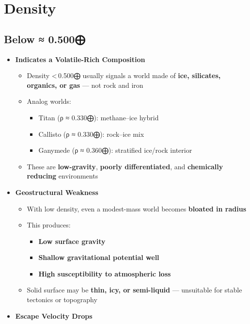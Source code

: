 \documentclass[
  letterpaper,
]{book}
\providecommand{\tightlist}{%
  \setlength{\itemsep}{0pt}\setlength{\parskip}{0pt}}
\begin{document}
\chapter{Density}\label{density}

\section{Below ≈ 0.500⨁}\label{below-0.500-1}

\begin{itemize}
\tightlist
\item
  \textbf{Indicates a Volatile-Rich Composition}

  \begin{itemize}
  \tightlist
  \item
    Density \textless\,0.500⨁ usually signals a world made of
    \textbf{ice, silicates, organics, or gas} --- not rock and iron\\
  \item
    Analog worlds:

    \begin{itemize}
    \tightlist
    \item
      Titan (ρ ≈ 0.330⨁): methane--ice hybrid\\
    \item
      Callisto (ρ ≈ 0.330⨁): rock--ice mix\\
    \item
      Ganymede (ρ ≈ 0.360⨁): stratified ice/rock interior\\
    \end{itemize}
  \item
    These are \textbf{low-gravity}, \textbf{poorly differentiated}, and
    \textbf{chemically reducing} environments
  \end{itemize}
\item
  \textbf{Geostructural Weakness}

  \begin{itemize}
  \tightlist
  \item
    With low density, even a modest-mass world becomes \textbf{bloated
    in radius}\\
  \item
    This produces:

    \begin{itemize}
    \tightlist
    \item
      \textbf{Low surface gravity}\\
    \item
      \textbf{Shallow gravitational potential well}\\
    \item
      \textbf{High susceptibility to atmospheric loss}
    \end{itemize}
  \item
    Solid surface may be \textbf{thin, icy, or semi-liquid} ---
    unsuitable for stable tectonics or topography
  \end{itemize}
\item
  \textbf{Escape Velocity Drops}


\end{itemize}
\end{document}
